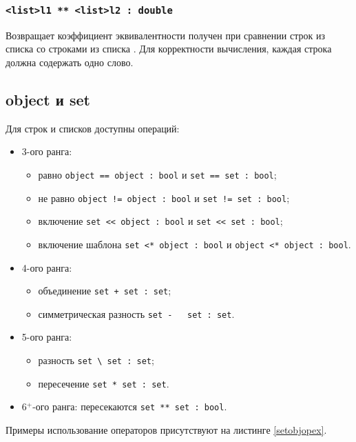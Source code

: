 \documentclass[a4paper, 14pt]{extarticle}
\newenvironment{icItems}
	{ \begin{itemize} [noitemsep,nolistsep] }
	{ \end{itemize} }
\begin{document}
\subsubsection{\lstinline`<list>l1 ** <list>l2 : double`}

Возвращает коэффициент эквивалентности получен при сравнении строк из списка  со строками из списка .
Для корректности вычисления, каждая строка должна содержать одно слово.

\subsection{{\color{lightblue}object} и {\color{lightblue}set}}

Для строк и списков доступны операций:
\begin{icItems}
	\item
		3-ого ранга:
		\begin{icItems}
		\item
			равно \lstinline`object == object : bool` и \lstinline`set == set : bool`;
		\item
			не равно \lstinline`object != object : bool` и \lstinline`set != set : bool`;
		\item
			включение \lstinline`set << object : bool` и \lstinline|set << set : bool|;
		\item
			включение шаблона \lstinline`set <* object : bool` и \lstinline`object <* object : bool`.
		\end{icItems}
	\item
		4-ого ранга:
		\begin{icItems}
		\item
			объединение \lstinline`set + set : set`;
		\item
			симметрическая разность \lstinline`set -   set : set`.
		\end{icItems}
	\item
		5-ого ранга:
		\begin{icItems}
		\item
			разность \lstinline`set \ set : set`;
		\item
			пересечение \lstinline`set * set : set`.
		\end{icItems}
	\item
		6$^+$-ого ранга: пересекаются \lstinline|set ** set : bool|.
\end{icItems}

Примеры использование операторов присутствуют на листинге \ref{setobjopex}.
\end{document}
